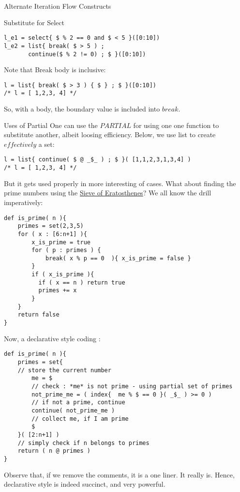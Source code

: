 \begin{section}{Alternate Iteration Flow Constructs}
\begin{subsection}{Substitute for Select}
\begin{lstlisting}[style=JexlStyle]
l_e1 = select{ $ % 2 == 0 and $ < 5 }([0:10])
l_e2 = list{ break( $ > 5 ) ; 
       continue($ % 2 != 0) ; $ }([0:10])
\end{lstlisting}

Note that Break body is inclusive:
  
\begin{lstlisting}[style=JexlStyle]
l = list{ break( $ > 3 ) { $ } ; $ }([0:10])
/* l = [ 1,2,3, 4] */
\end{lstlisting}
 
So, with a body, the boundary value is included into $break$.
\end{subsection}

\begin{subsection}{Uses of Partial}
One can use the $PARTIAL$ for using one one function to substitute another,
albeit loosing efficiency.
Below, we use list to create $effectively$ a set:

\begin{lstlisting}[style=JexlStyle]
l = list{ continue( $ @ _$_ ) ; $ }( [1,1,2,3,1,3,4] )
/* l = [ 1,2,3, 4] */
\end{lstlisting}

But it gets used properly in more interesting of cases.
What about finding the prime numbers using the \href{https://en.wikipedia.org/wiki/Sieve_of_Eratosthenes}{Sieve of Eratosthenes}?
We all know the drill imperatively:

\begin{lstlisting}[style=JexlStyle]
def is_prime( n ){
    primes = set(2,3,5)
    for ( x : [6:n+1] ){
        x_is_prime = true 
        for ( p : primes ) {
            break( x % p == 0  ){ x_is_prime = false }
        }
        if ( x_is_prime ){
          if ( x == n ) return true 
          primes += x 
        }
    }
    return false 
}
\end{lstlisting}
Now, a declarative style coding :
\begin{lstlisting}[style=JexlStyle]
def is_prime( n ){
    primes = set{
    // store the current number
        me = $
        // check : *me* is not prime - using partial set of primes
        not_prime_me = ( index{  me % $ == 0 }( _$_ ) >= 0 ) 
        // if not a prime, continue 
        continue( not_prime_me )
        // collect me, if I am prime 
        $   
    }( [2:n+1] )
    // simply check if n belongs to primes
    return ( n @ primes )  
}
\end{lstlisting}
Observe that, if we remove the comments, it is a one liner. 
It really is. Hence, declarative style is indeed succinct, and very powerful.

\end{subsection}

\end{section}



